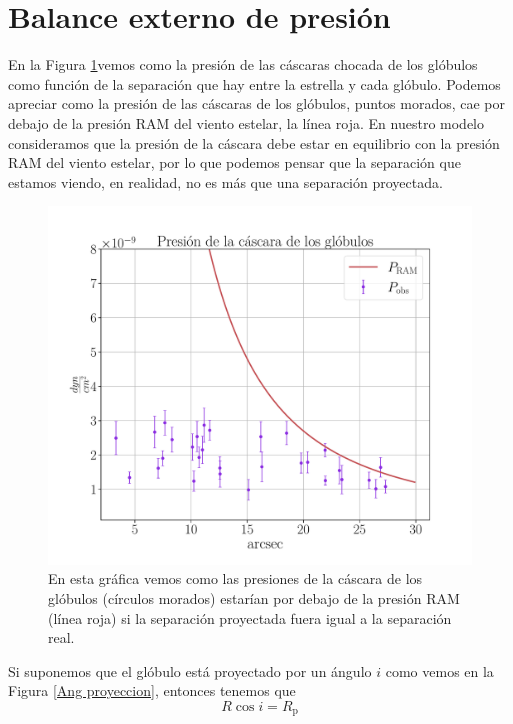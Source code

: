 \documentclass{book}
\begin{document}
\section{Balance externo de presión}\label{Sec:proyeccion}

En la Figura \ref{graf_presion}vemos como la presión de las cáscaras chocada de los glóbulos como función de la separación que hay entre la estrella y cada glóbulo. Podemos apreciar como la presión de las cáscaras de los glóbulos, puntos morados, cae por debajo de la presión RAM del viento estelar, la línea roja. En nuestro modelo consideramos que la presión de la cáscara debe estar en equilibrio con la presión RAM del viento estelar, por lo que podemos pensar que la separación que estamos viendo, en realidad, no es más que una separación proyectada. 

\begin{figure}[htb]
    \centering
    \includegraphics[width=\textwidth]{imagenes_corregidas/S_R.pdf}
    \caption{En esta gráfica vemos como las presiones de la cáscara de los glóbulos (círculos morados) estarían por debajo de la presión RAM (línea roja) si la separación proyectada fuera igual a la separación real.}
    \label{graf_presion}
\end{figure}

Si suponemos que el glóbulo está proyectado por un ángulo $i$ como vemos en la Figura \ref{Ang proyeccion}, entonces tenemos que 
\begin{equation}
R\cos i=R_\mathrm{p}
\end{equation}\label{eq:sep_real} 
\end{document}
